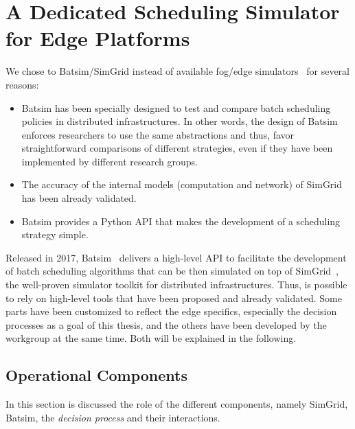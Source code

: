 \chapter{A Dedicated Scheduling Simulator for Edge Platforms}
\label{sec:simulation}


We chose to Batsim/SimGrid instead of available fog/edge simulators~\cite{ifogsim,edgecloudsim,iotsim} for several reasons: 
\begin{itemize}
    \item Batsim has been specially designed to test and compare batch scheduling policies in distributed infrastructures. In other words, the design of Batsim enforces researchers to use the same abstractions and thus, favor straightforward comparisons of different strategies, even if they have been implemented by different research groups.
    \item The accuracy of the internal models (computation and network) of SimGrid has been already validated.
    \item Batsim provides a Python API that makes the development of a scheduling strategy simple.
\end{itemize} 

Released in 2017, Batsim~\cite{batsim} delivers a high-level API to facilitate the development of batch scheduling algorithms that can be then simulated on top of SimGrid~\cite{simgrid}, the well-proven simulator toolkit for distributed infrastructures.
%
Thus, is possible to rely on high-level tools that have been proposed and already validated. Some parts have been customized to reflect the edge specifics, especially the decision processes as a goal of this thesis, and the others have been developed by the workgroup at the same time. Both will be explained in the following.

\section{Operational Components}
\label{ssec:operational_components}

In this section is discussed the role of the different components, namely SimGrid, Batsim, the \emph{decision process} and their interactions.


